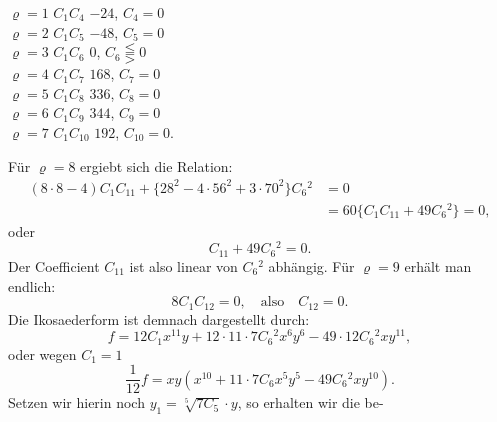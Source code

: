 \documentclass[11pt]{article}
\begin{document}
\begin{flushleft}
\text{\textquotedbl}\quad $\varrho=1$ \quad \text{\textquotedbl}\quad\text{\textquotedbl}\quad\quad\text{\textquotedbl}\quad\text{\textquotedbl}\quad $C_1C_4$ \quad \text{\textquotedbl}\quad\text{\textquotedbl}\quad $-24$, \quad \text{\textquotedbl}\quad $C_4=0$\\
\text{\textquotedbl}\quad $\varrho=2$ \quad \text{\textquotedbl}\quad\text{\textquotedbl}\quad\quad\text{\textquotedbl}\quad\text{\textquotedbl}\quad $C_1C_5$ \quad \text{\textquotedbl}\quad\text{\textquotedbl}\quad $-48$, \quad \text{\textquotedbl}\quad $C_5=0$\\
\text{\textquotedbl}\quad $\varrho=3$ \quad \text{\textquotedbl}\quad\text{\textquotedbl}\quad\quad\text{\textquotedbl}\quad\text{\textquotedbl}\quad $C_1C_6$ \quad \text{\textquotedbl}\quad\text{\textquotedbl}\quad $0$, \quad \text{\textquotedbl}\quad $C_6\lesseqqgtr 0$ %
\\
\text{\textquotedbl}\quad $\varrho=4$ \quad \text{\textquotedbl}\quad\text{\textquotedbl}\quad\quad\text{\textquotedbl}\quad\text{\textquotedbl}\quad $C_1C_7$ \quad \text{\textquotedbl}\quad\text{\textquotedbl}\quad $168$, \quad \text{\textquotedbl}\quad $C_7=0$\\
\text{\textquotedbl}\quad $\varrho=5$ \quad \text{\textquotedbl}\quad\text{\textquotedbl}\quad\quad\text{\textquotedbl}\quad\text{\textquotedbl}\quad $C_1C_8$ \quad \text{\textquotedbl}\quad\text{\textquotedbl}\quad $336$, \quad \text{\textquotedbl}\quad $C_8=0$\\
\text{\textquotedbl}\quad $\varrho=6$ \quad \text{\textquotedbl}\quad\text{\textquotedbl}\quad\quad\text{\textquotedbl}\quad\text{\textquotedbl}\quad $C_1C_9$ \quad \text{\textquotedbl}\quad\text{\textquotedbl}\quad $344$, \quad \text{\textquotedbl}\quad $C_9=0$\\
\text{\textquotedbl}\quad $\varrho=7$ \quad \text{\textquotedbl}\quad\text{\textquotedbl}\quad\quad\text{\textquotedbl}\quad\text{\textquotedbl}\quad $C_1C_{10}$ \quad \text{\textquotedbl}\quad\text{\textquotedbl}\quad $192$, \quad \text{\textquotedbl}\quad $C_{10}=0$.
\end{flushleft}

Für $\varrho=8$ ergiebt sich die Relation:
\[
\begin{aligned}
(8\cdot8-4)C_1C_{11}+\{28^2-4\cdot56^2+3\cdot70^2\}C_6{}^2&=0\\
&=60\{C_1C_{11}+49C_6{}^2\}=0,
\end{aligned}
\]
oder
\[
C_{11}+49C_6{}^2=0.
\]
Der Coefficient $C_{11}$ ist also linear von $C_6{}^2$ abhängig. Für $\varrho=9$
erhält man endlich:
\[
8C_1C_{12}=0,\quad\text{also}\quad C_{12}=0.
\]
Die Ikosaederform ist demnach dargestellt durch:
\[
f=12C_1x^{11}y+12\cdot11\cdot7C_6{}^2x^6y^6-49\cdot12C_6{}^2xy^{11},
\]
oder wegen $C_1=1$
\[
\frac{1}{12}f=xy(x^{10}+11\cdot7C_6x^5y^5-49C_6{}^2xy^{10}).
\]
Setzen wir hierin noch $y_1=\sqrt[5]{7C_5}\cdot y$, so erhalten wir die be-
\end{document}
